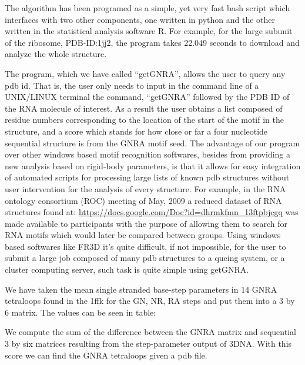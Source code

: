 The  algorithm has  been programed  as a  simple, yet  very  fast bash
script  which interfaces  with two  other components,  one  written in
python and the  other written in the statistical  analysis software R.
For example, for  the large subunit of the  ribosome, PDB-ID:1jj2, the
program  takes  22.049  seconds  to  download and  analyze  the  whole
structure. 

The  program, which  we have  called ``getGNRA'',  allows the  user to
query any pdb id. That is, the user only needs to input in the command
line of a UNIX/LINUX terminal the command, ``getGNRA'' followed by the
PDB ID of the RNA molecule of interest. As a result the user obtains a
list composed of residue numbers  corresponding to the location of the
start of the motif in the  structure, and a score which stands for how
close or far  a four nucleotide sequential structure  is from the GNRA
motif seed.   The advantage  of our program  over other  windows based
motif  recognition softwares,  besides from  providing a  new analysis
based on rigid-body parameters, is that it allows for easy integration
of  automated  scripts  for   processing  large  lists  of  known  pdb
structures  without  user  intervention   for  the  analysis  of  every
structure. For  example, in the RNA ontology  consortium (ROC) meeting
of  May,  2009   a  reduced  dataset  of  RNA   structures  found  at:
\url{https://docs.google.com/Doc?id=dhrmkfmn_13ftpbjcgq}    was   made
available to participants with the  purpose of allowing them to search
for RNA  motifs which  would later be  compared between  groups. Using
windows  based  softwares   like  FR3D  \cite{sarver2008}  it's  quite
difficult,  if not  impossible, for  the user  to submit  a  large job
composed  of many  pdb structures  to a  queing system,  or  a cluster
computing server, such task is quite simple using getGNRA.

We  have  taken the  mean  single stranded  base-step
parameters in 14 GNRA tetraloops found  in the 1ffk for the GN, NR, RA
steps and  put them into a  3 by 6 matrix.  The values can  be seen in
table:

We  compute the  sum of  the difference  between the  GNRA  matrix and
sequential 3 by six  matrices resulting from the step-parameter output
of 3DNA. With  this score we can find the GNRA  tetraloops given a pdb
file.


